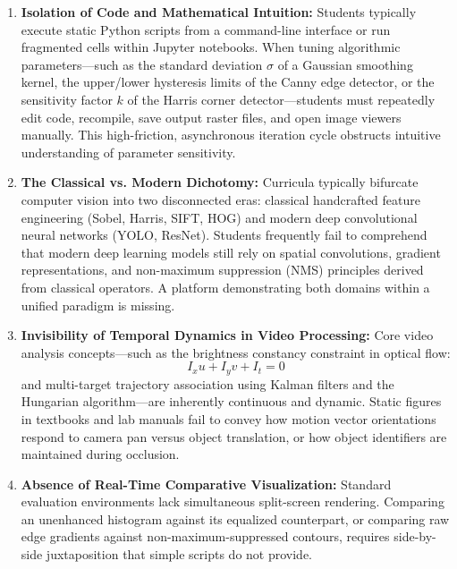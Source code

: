 \begin{enumerate}
    \item \textbf{Isolation of Code and Mathematical Intuition:}
    Students typically execute static Python scripts from a command-line interface or run fragmented cells within Jupyter notebooks. When tuning algorithmic parameters—such as the standard deviation $\sigma$ of a Gaussian smoothing kernel, the upper/lower hysteresis limits of the Canny edge detector, or the sensitivity factor $k$ of the Harris corner detector—students must repeatedly edit code, recompile, save output raster files, and open image viewers manually. This high-friction, asynchronous iteration cycle obstructs intuitive understanding of parameter sensitivity.

    \item \textbf{The Classical vs. Modern Dichotomy:}
    Curricula typically bifurcate computer vision into two disconnected eras: classical handcrafted feature engineering (Sobel, Harris, SIFT, HOG) and modern deep convolutional neural networks (YOLO, ResNet). Students frequently fail to comprehend that modern deep learning models still rely on spatial convolutions, gradient representations, and non-maximum suppression (NMS) principles derived from classical operators. A platform demonstrating both domains within a unified paradigm is missing.

    \item \textbf{Invisibility of Temporal Dynamics in Video Processing:}
    Core video analysis concepts—such as the brightness constancy constraint in optical flow:
    \begin{equation}
        I_x u + I_y v + I_t = 0
    \end{equation}
    and multi-target trajectory association using Kalman filters and the Hungarian algorithm—are inherently continuous and dynamic. Static figures in textbooks and lab manuals fail to convey how motion vector orientations respond to camera pan versus object translation, or how object identifiers are maintained during occlusion.

    \item \textbf{Absence of Real-Time Comparative Visualization:}
    Standard evaluation environments lack simultaneous split-screen rendering. Comparing an unenhanced histogram against its equalized counterpart, or comparing raw edge gradients against non-maximum-suppressed contours, requires side-by-side juxtaposition that simple scripts do not provide.
\end{enumerate}


